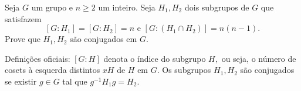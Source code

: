 Seja \(G\) um grupo e \(n \ge 2\) um inteiro. Seja \(H_1, H_2\) dois subgrupos de \(G\) que satisfazem \[[G: H_1] = [G: H_2] = n \text{ e } [G: (H_1 \cap H_2)] = n(n-1).\] Prove que \(H_1, H_2\) são conjugados em \(G.\)

Definições oficiais: \([G:H]\) denota o índice do subgrupo \(H,\) ou seja, o número de cosets à esquerda distintos \(xH\) de \(H\) em \(G.\) Os subgrupos \(H_1, H_2\) são conjugados se existir \(g \in G\) tal que \(g^{-1} H_1 g = H_2.\)

